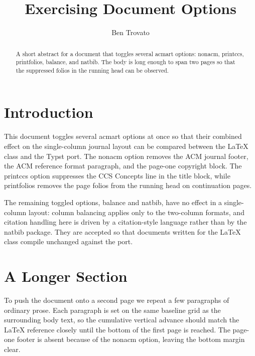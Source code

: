 \documentclass[acmsmall,nonacm,balance=false,natbib=false]{acmart}
\begin{document}
\title{Exercising Document Options}

\author{Ben Trovato}

\renewcommand{\shortauthors}{Trovato}

\begin{abstract}
  A short abstract for a document that toggles several acmart options: nonacm,
  printccs, printfolios, balance, and natbib. The body is long enough to span two
  pages so that the suppressed folios in the running head can be observed.
\end{abstract}



\maketitle

\section{Introduction}
This document toggles several acmart options at once so that their combined
effect on the single-column journal layout can be compared between the LaTeX
class and the Typst port. The nonacm option removes the ACM journal footer, the
ACM reference format paragraph, and the page-one copyright block. The printccs
option suppresses the CCS Concepts line in the title block, while printfolios
removes the page folios from the running head on continuation pages.

The remaining toggled options, balance and natbib, have no effect in a
single-column layout: column balancing applies only to the two-column formats,
and citation handling here is driven by a citation-style language rather than by
the natbib package. They are accepted so that documents written for the LaTeX
class compile unchanged against the port.

\section{A Longer Section}
To push the document onto a second page we repeat a few paragraphs of ordinary
prose. Each paragraph is set on the same baseline grid as the surrounding body
text, so the cumulative vertical advance should match the LaTeX reference closely
until the bottom of the first page is reached. The page-one footer is absent
because of the nonacm option, leaving the bottom margin clear.
\end{document}
